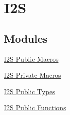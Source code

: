 \hypertarget{group___i2_s}{\section{\-I2\-S}
\label{group___i2_s}
}
\subsection*{\-Modules}
\begin{DoxyCompactItemize}
\item 
\hyperlink{group___i2_s___public___macros}{\-I2\-S Public Macros}
\item 
\hyperlink{group___i2_s___private___macros}{\-I2\-S Private Macros}
\item 
\hyperlink{group___i2_s___public___types}{\-I2\-S Public Types}
\item 
\hyperlink{group___i2_s___public___functions}{\-I2\-S Public Functions}
\end{DoxyCompactItemize}
